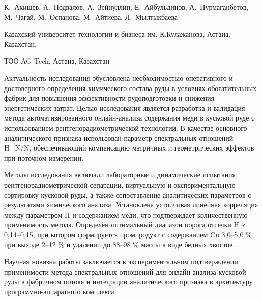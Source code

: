 
\begin{header}

К.~Акишев\envelope,
А.~Подвалов,
А.~Зейнуллин,
Е.~Айбульдинов\envelope,
А.~Нурмаганбетов,
М.~Чагай,
М.~Оспанова,
М.~Айтиева,
Л.~Мылтыкбаева
\end{header}

\begin{affil}
Казахский университет технологии и бизнеса им. К.Кулажанова, Астана, Казахстан,

ТОО AG Tech, Астана, Казахстан

\end{affil}

Актуальность исследования обусловлена необходимостью оперативного и
достоверного определения химического состава руды в условиях
обогатительных фабрик для повышения эффективности рудоподготовки и
снижения энергетических затрат. Целью исследования является разработка и
валидация метода автоматизированного онлайн-анализа содержания меди в
кусковой руде с использованием рентгенорадиометрической технологии. В
качестве основного аналитического признака использован параметр
спектральных отношений H=N/N,
обеспечивающий компенсацию матричных и геометрических эффектов при
поточном измерении.

Методы исследования включали лабораторные и динамические испытания
рентгенорадиометрической сепарации, виртуальную и экспериментальную
сортировку кусковой руды, а также сопоставление аналитических параметров
с результатами химического анализа. Установлена устойчивая линейная
корреляция между параметром H и содержанием меди, что подтверждает
количественную применимость метода. Определён оптимальный диапазон
порога отсечки H ≈ 0,14--0,15, при котором формируется промпродукт с
содержанием Cu 3,0--5,0 \% при выходе 2--12 \% и удалении до 88--98 \%
массы в виде бедных хвостов.

Научная новизна работы заключается в экспериментальном подтверждении
применимости метода спектральных отношений для онлайн-анализа кусковой
руды в фабричном потоке и интеграции аналитического признака в
архитектуру программно-аппаратного комплекса.

